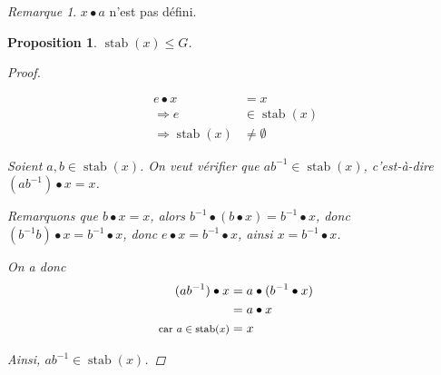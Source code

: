\documentclass{report}
\newcommand*{\lte}{\leqslant}
\newcommand*{\stab}{\operatorname{stab}}
\newtheorem*{prop}{Proposition}
\theoremstyle{definition}
\theoremstyle{remark}
\newtheorem*{rema}{Remarque}
\begin{document}
	
	\begin{rema}
		$x \bullet a$ n'est pas d\'efini.
	\end{rema}
	\begin{prop}
		$\stab(x) \lte G$.
		\begin{proof}~

			\begin{align*}
				e \bullet x&= x\\
				\Rightarrow e&\in \stab(x)\\
				\Rightarrow \stab(x)&\neq \emptyset
			\end{align*}

			Soient $a,b \in \stab(x)$. On veut v\'erifier que $ab^{-1} \in \stab(x)$, c'est-\`a-dire $(ab^{-1}) \bullet x = x$.

			Remarquons que $b \bullet x = x$, alors $b^{-1} \bullet (b \bullet x) = b^{-1} \bullet x$, donc $(b^{-1}b) \bullet x = b^{-1} \bullet x$, donc $e \bullet x = b^{-1} \bullet x$, ainsi $x = b^{-1} \bullet x$.

			On a donc
			\begin{align*}
				(ab^{-1}) \bullet x&= a \bullet (b^{-1} \bullet x)\\
				&= a \bullet x\\
				\text{\footnotesize car $a \in \stab(x)$}&= x
			\end{align*}

			Ainsi, $ab^{-1} \in \stab(x)$.
		\end{proof}
	\end{prop}
\end{document}
